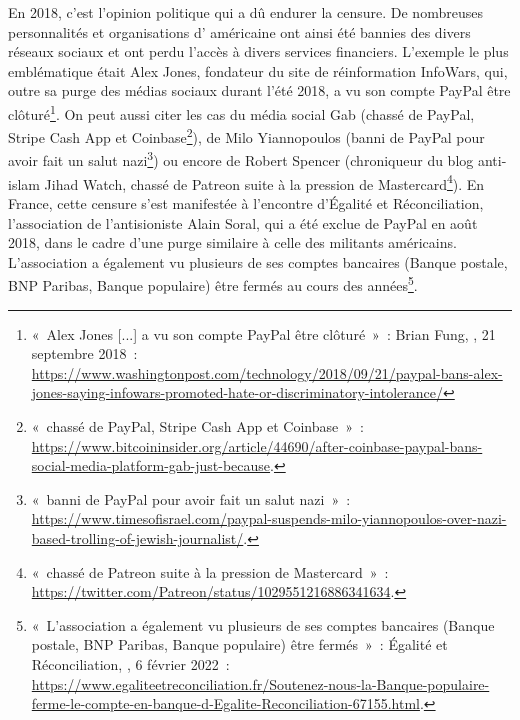
En 2018, c'est l'opinion politique qui a dû endurer la censure. De nombreuses personnalités et organisations d' américaine ont ainsi été bannies des divers réseaux sociaux et ont perdu l'accès à divers services financiers. L'exemple le plus emblématique était Alex Jones, fondateur du site de réinformation InfoWars, qui, outre sa purge des médias sociaux durant l'été 2018, a vu son compte PayPal être clôturé\footnote{«~Alex Jones [...] a vu son compte PayPal être clôturé~»~: Brian Fung, , 21 septembre 2018~: \url{https://www.washingtonpost.com/technology/2018/09/21/paypal-bans-alex-jones-saying-infowars-promoted-hate-or-discriminatory-intolerance/}}. On peut aussi citer les cas du média social Gab (chassé de PayPal, Stripe Cash App et Coinbase\footnote{«~chassé de PayPal, Stripe Cash App et Coinbase~»~: \url{https://www.bitcoininsider.org/article/44690/after-coinbase-paypal-bans-social-media-platform-gab-just-because}.}), de Milo Yiannopoulos (banni de PayPal pour avoir fait un salut nazi\footnote{«~banni de PayPal pour avoir fait un salut nazi~»~: \url{https://www.timesofisrael.com/paypal-suspends-milo-yiannopoulos-over-nazi-based-trolling-of-jewish-journalist/}.}) ou encore de Robert Spencer (chroniqueur du blog anti-islam Jihad Watch, chassé de Patreon suite à la pression de Mastercard\footnote{«~chassé de Patreon suite à la pression de Mastercard~»~: \url{https://twitter.com/Patreon/status/1029551216886341634}.}). En France, cette censure s'est manifestée à l'encontre d'Égalité et Réconciliation, l'association de l'antisioniste Alain Soral, qui a été exclue de PayPal en août 2018, dans le cadre d'une purge similaire à celle des militants américains. L'association a également vu plusieurs de ses comptes bancaires (Banque postale, BNP Paribas, Banque populaire) être fermés au cours des années\footnote{«~L'association a également vu plusieurs de ses comptes bancaires (Banque postale, BNP Paribas, Banque populaire) être fermés~»~: Égalité et Réconciliation, , 6 février 2022~: \url{https://www.egaliteetreconciliation.fr/Soutenez-nous-la-Banque-populaire-ferme-le-compte-en-banque-d-Egalite-Reconciliation-67155.html}.}.

